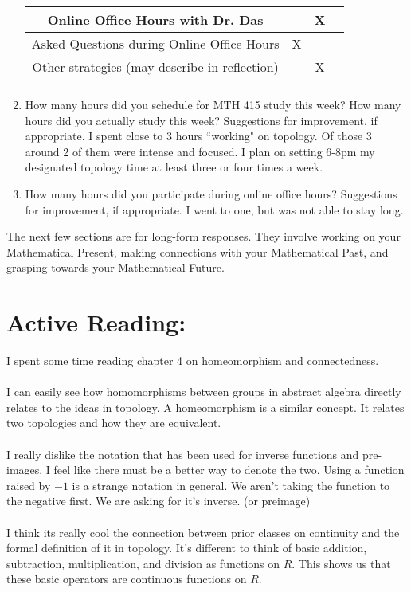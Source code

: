 \documentclass[11pt]{article}
\begin{document}
\begin{enumerate}
\begin{tabular}{|c|c|c|c|}
		Online Office Hours with Dr. Das &&X&\\
		\hline		
		Asked Questions during Online Office Hours &X&&\\
		\hline
		\hline
		
		Other strategies (may describe in reflection) &&X&\\
		&&&\\
		\hline
		
			
	\end{tabular}

\item How many hours did you schedule for MTH 415 study this week? How many hours did you actually study this week? Suggestions for improvement, if appropriate.
\vfill
I spent close to 3 hours ``working" on topology. Of those 3 around 2 of them were intense and focused. I plan on setting 6-8pm my designated topology time at least three or four times a week.
\item How many hours did you participate during online office hours? Suggestions for improvement, if appropriate.
\vfill
I went to one, but was not able to stay long.

\end{enumerate}

\newpage
The next few sections are for long-form responses. They involve working on your Mathematical Present, making connections with your Mathematical Past, and grasping towards your Mathematical Future.

\section*{Active Reading:}

I spent some time reading chapter 4 on homeomorphism and connectedness. \\
\\
I can easily see how homomorphisms between groups in abstract algebra directly relates to the ideas in topology. A homeomorphism is a similar concept. It relates two topologies and how they are equivalent. \\
\\
I really dislike the notation that has been used for inverse functions and pre-images. I feel like there must be a better way to denote the two. Using a function raised by $-1$ is a strange notation in general. We aren't taking the function to the negative first. We are asking for it's inverse. (or preimage)\\
\\
I think its really cool the connection between prior classes on continuity and the formal definition of it in topology. It's different to think of basic addition, subtraction, multiplication, and division as functions on $ R $. This shows us that these basic operators are continuous functions on $ R $.
\end{document}
